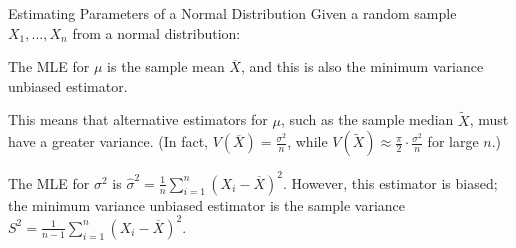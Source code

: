 \documentclass[handout]{beamer}
\renewcommand{\emph}{\textbf}
\begin{document}
\begin{frame}{Estimating Parameters of a Normal Distribution}
Given a random sample $X_1,\dots, X_n$ from a normal distribution:
\begin{block}{}
The MLE for $\mu$ is the sample mean $\overline{X}$, and this is also the minimum variance unbiased estimator.
\end{block}
This means that alternative estimators for $\mu$, such as the sample median $\tilde X$, must have a greater variance. (In fact, $V(\overline{X})=\frac{\sigma^2}n$, while $V(\tilde X) \approx \frac\pi2\cdot \frac{\sigma^2}n$ for large $n$.)

\begin{block}{}
The MLE for $\sigma^2$ is $\hat{\sigma}^2=\frac1{n}\sum_{i=1}^n (X_i-\overline X)^2$. However, this estimator is biased; the minimum variance unbiased estimator is the sample variance $S^2=\frac1{n-1}\sum_{i=1}^n (X_i-\overline X)^2$.
\end{block}

%
%
\end{frame}
\end{document}

